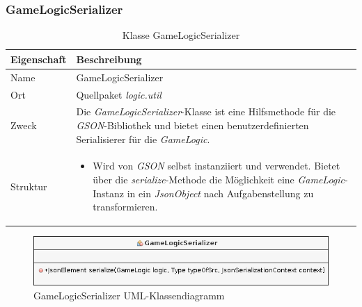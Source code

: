     \subsubsection{GameLogicSerializer}
        \begin{table}[H]
            \caption{Klasse GameLogicSerializer}
            \begin{tabular}{p{2.5cm}  p{9.5cm}} 
                \hline
                \textbf{Eigenschaft} & \textbf{Beschreibung}\\
                \hline
                Name & GameLogicSerializer\\
                Ort & Quellpaket \textit{logic.util}\\
                \hline
                Zweck &
                Die \textit{GameLogicSerializer}-Klasse ist eine Hilfsmethode für die \textit{GSON}-Bibliothek
                und bietet einen benutzerdefinierten Serialisierer für die \textit{GameLogic}.
                \\
                \hline
                Struktur &
                \begin{itemize}
                    \itemsep0em
                    \item Wird von \textit{GSON} selbst instanziiert und verwendet.
                    Bietet über die \textit{serialize}-Methode die Möglichkeit eine \textit{GameLogic}-Instanz in ein \textit{JsonObject}
                    nach Aufgabenstellung zu transformieren.
                \end{itemize}
                \\
                \hline
            \end{tabular}
        \end{table}
        \begin{figure}[H]
            \centering
            \includegraphics[scale=0.6]{img/uml/gameLogicSerializer.png}   
            \caption{GameLogicSerializer UML-Klassendiagramm}
        \end{figure}

